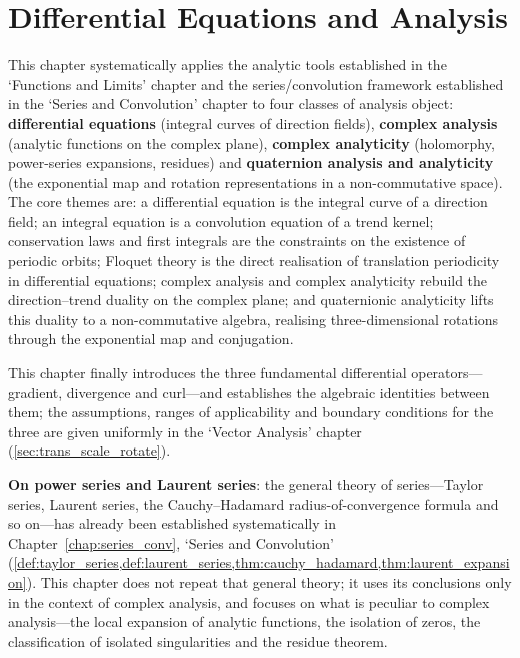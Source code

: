 \chapter{Differential Equations and Analysis}
\label{chap:diffeq_complex}

\begin{remark}\label{rem:diffeq_chapter_positioning}
This chapter systematically applies the analytic tools established in the `Functions and Limits' chapter and the series/convolution framework established in the `Series and Convolution' chapter to four classes of analysis object: \textbf{differential equations} (integral curves of direction fields), \textbf{complex analysis} (analytic functions on the complex plane), \textbf{complex analyticity} (holomorphy, power-series expansions, residues) and \textbf{quaternion analysis and analyticity} (the exponential map and rotation representations in a non-commutative space). The core themes are: a differential equation is the integral curve of a direction field; an integral equation is a convolution equation of a trend kernel; conservation laws and first integrals are the constraints on the existence of periodic orbits; Floquet theory is the direct realisation of translation periodicity in differential equations; complex analysis and complex analyticity rebuild the direction--trend duality on the complex plane; and quaternionic analyticity lifts this duality to a non-commutative algebra, realising three-dimensional rotations through the exponential map and conjugation.

This chapter finally introduces the three fundamental differential operators---gradient, divergence and curl---and establishes the algebraic identities between them; the assumptions, ranges of applicability and boundary conditions for the three are given uniformly in the `Vector Analysis' chapter (\cref{sec:trans_scale_rotate}).

\textbf{On power series and Laurent series}: the general theory of series---Taylor series, Laurent series, the Cauchy--Hadamard radius-of-convergence formula and so on---has already been established systematically in Chapter~\ref{chap:series_conv}, `Series and Convolution' (\cref{def:taylor_series,def:laurent_series,thm:cauchy_hadamard,thm:laurent_expansion}). This chapter does not repeat that general theory; it uses its conclusions only in the context of complex analysis, and focuses on what is peculiar to complex analysis---the local expansion of analytic functions, the isolation of zeros, the classification of isolated singularities and the residue theorem.


\end{remark}
